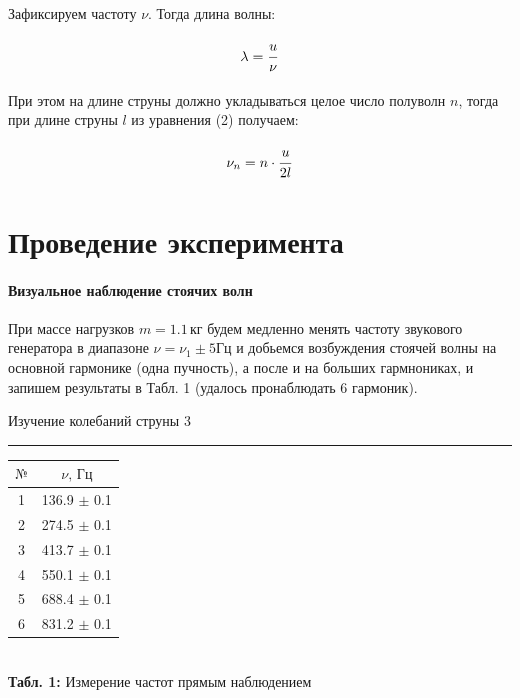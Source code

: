 \documentclass[12pt,a4paper]{scrartcl}
\begin{document}
	Зафиксируем частоту $\nu$. Тогда длина волны:
	
	\begin{equation}
		\lambda = \dfrac{\strut u}{\strut \nu}
	\end{equation}
	
	При этом на длине струны должно укладываться целое число полуволн $n$, тогда при длине струны $l$ из уравнения (2) получаем:
	
	\begin{equation}
		\nu_n = n \cdot \dfrac{\strut u}{\strut 2l}
	\end{equation}

	\section{Проведение эксперимента}
	
	\paragraph{Визуальное наблюдение стоячих волн} \hfill
	
	\par При массе нагрузков $m = 1.1 \, \text{кг}$ будем медленно менять частоту звукового генератора в диапазоне $\nu=\nu_1 \pm 5$Гц и добьемся возбуждения стоячей волны на основной гармонике (одна пучность), а после и на больших гармнониках, и запишем результаты в Табл. 1 (удалось пронаблюдать 6 гармоник).
	
	
	\newpage
	
	\begin{flushleft}
		\footnotesize{Изучение колебаний струны} \hspace{\fill} \footnotesize{3}
		\\[-0.3cm]\noindent\rule{\textwidth}{0.3pt}
	\end{flushleft}
	
	\begin{center}
		\begin{tabular}{|c|c|}
			\hline
			$№$ & $\nu,\,\text{Гц}$   \\
			\hline 
			1 & 136.9 $\pm$ 0.1 \\
			\hline
			2 & 274.5 $\pm$ 0.1 \\
			\hline 
			3 & 413.7 $\pm$ 0.1 \\
			\hline
			4 & 550.1 $\pm$ 0.1 \\
			\hline
			5 & 688.4 $\pm$ 0.1 \\
			\hline
			6 & 831.2 $\pm$ 0.1 \\
			\hline
		\end{tabular}
		\\\textbf{Табл. 1: } Измерение частот прямым наблюдением
	\end{center}
\end{document}
